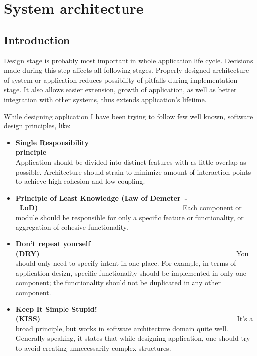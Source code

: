 %


\chapter{System architecture}
\label{cha:sys_arch}


\section{Introduction}
\label{sec:gui}

Design stage is probably most important in whole application life cycle. Decisions made during this step affects 
all following stages. Properly designed architecture of system or application reduces possibility of pitfalls during
implementation stage. It also allows easier extension, growth of application, as well as better integration with other
systems, thus extends application's lifetime. 

While designing application I have been trying to follow few well known, software design principles, like:
\begin{itemize}
 \item {\bf Single Responsibility
principle}~~~~~~~~~~~~~~~~~~~~~~~~~~~~~~~~~~~~~~~~~~~~~~~~~~~~~~~~\linebreak
Application should be divided into distinct features with as
little overlap as possible. Architecture should strain to minimize amount of interaction points to achieve high cohesion
and low coupling.
 \item {\bf Principle of Least Knowledge (Law of Demeter~-~LoD)}~~~~~~~~~~~~~~~~~~~~~~~~~~~~~~~~~~~~~~~~~\linebreak
Each component or module should be responsible for only a specific feature or functionality, or aggregation of cohesive
functionality.
 \item {\bf Don't repeat yourself (DRY)}~~~~~~~~~~~~~~~~~~~~~~~~~~~~~~~~~~~~~~~~~~~~~~~~~~~~~~~~\linebreak
You should only need to specify intent in one place. For example, in terms of application design, specific functionality
should be implemented in only one component; the functionality should not be duplicated in any other component.
 \item {\bf Keep It Simple Stupid! (KISS)}~~~~~~~~~~~~~~~~~~~~~~~~~~~~~~~~~~~~~~~~~~~~~~~~~~~~~~~~\linebreak
It's a broad principle, but works in software architecture domain quite well. Generally speaking, it states that while
designing application, one should try to avoid creating unnecessarily complex structures.
\end{itemize}

